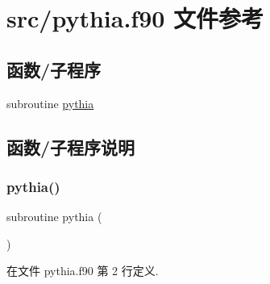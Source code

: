 \hypertarget{pythia_8f90}{}\section{src/pythia.f90 文件参考}
\label{pythia_8f90}
\subsection*{函数/子程序}
\begin{DoxyCompactItemize}
\item 
subroutine \mbox{\hyperlink{pythia_8f90_a3b4e3111fff758e26d871c35d252acd3}{pythia}}
\end{DoxyCompactItemize}


\subsection{函数/子程序说明}
\mbox{\label{pythia_8f90_a3b4e3111fff758e26d871c35d252acd3}} 
\subsubsection{\texorpdfstring{pythia()}{pythia()}}
{\footnotesize\ttfamily subroutine pythia (\begin{DoxyParamCaption}{ }\end{DoxyParamCaption})}



在文件 pythia.\+f90 第 2 行定义.

